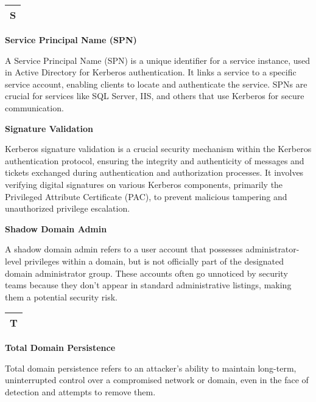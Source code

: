 \begin{table}
\justifying

\begin{tabular}{l}
\textbf{S} \\
\hline

\end{tabular}

\end{table}

\textbf{Service Principal Name (SPN)}

A Service Principal Name (SPN) is a unique identifier for a service instance, used in Active Directory for Kerberos authentication. It links a service to a specific service account, enabling clients to locate and authenticate the service. SPNs are crucial for services like SQL Server, IIS, and others that use Kerberos for secure communication.

\textbf{Signature Validation}

Kerberos signature validation is a crucial security mechanism within the Kerberos authentication protocol, ensuring the integrity and authenticity of messages and tickets exchanged during authentication and authorization processes. It involves verifying digital signatures on various Kerberos components, primarily the Privileged Attribute Certificate (PAC), to prevent malicious tampering and unauthorized privilege escalation.

\textbf{Shadow Domain Admin}

A shadow domain admin refers to a user account that possesses administrator-level privileges within a domain, but is not officially part of the designated domain administrator group. These accounts often go unnoticed by security teams because they don't appear in standard administrative listings, making them a potential security risk.

\begin{table}
\justifying

\begin{tabular}{l}
\textbf{T} \\
\hline

\end{tabular}

\end{table}

\textbf{Total Domain Persistence}

Total domain persistence refers to an attacker's ability to maintain long-term, uninterrupted control over a compromised network or domain, even in the face of detection and attempts to remove them.

